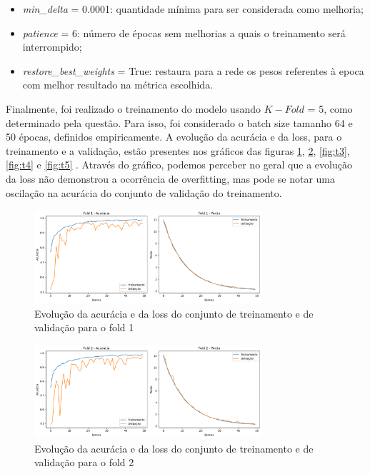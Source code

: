 \documentclass[]{abntex2}
\begin{document}
\begin{itemize}
    \item \textit{min\_delta} = 0.0001:  quantidade mínima para ser considerada como melhoria;
    \item \textit{patience} = 6: número de épocas sem melhorias a quais o treinamento será interrompido;
    \item \textit{restore\_best\_weights} = True: restaura para a rede os pesos referentes à epoca com melhor resultado na métrica escolhida.
\end{itemize}

Finalmente, foi realizado o treinamento do modelo usando $K-Fold$ = 5, como determinado pela questão. Para isso, foi considerado o batch size tamanho 64 e 50 épocas, definidos empiricamente. A evolução da acurácia e da loss, para o treinamento e a validação, estão presentes nos gráficos das figuras \ref{fig:t1}, \ref{fig:t2}, \ref{fig:t3},\ref{fig:t4} e \ref{fig:t5} . Através do gráfico, podemos perceber no geral que a evolução da loss não demonstrou a ocorrência de overfitting, mas pode se notar uma oscilação na acurácia do conjunto de validação do treinamento.

\begin{figure}[H]
    \centering 
    \includegraphics[width=0.75\textwidth]{imgs/ex2/train_f1.png}
    \caption{Evolução da acurácia e da loss do conjunto de treinamento e de validação para o fold 1}
    \label{fig:t1} %
\end{figure}

\begin{figure}[H]
    \centering 
    \includegraphics[width=0.75\textwidth]{imgs/ex2/train_f2.png}
    \caption{Evolução da acurácia e da loss do conjunto de treinamento e de validação para o fold 2}
    \label{fig:t2} %
\end{figure}
\end{document}
